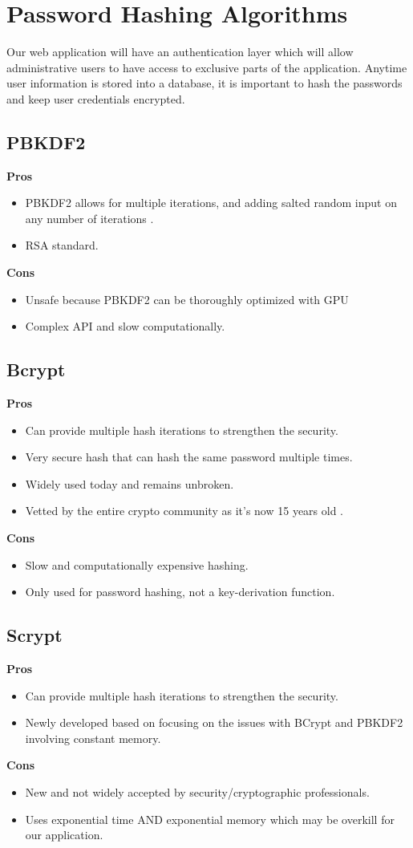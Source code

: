\documentclass[onecolumn, draftclsnofoot,10pt, compsoc]{IEEEtran}
\begin{document}
\section{Password Hashing Algorithms}
Our web application will have an authentication layer which will allow administrative users to have access to exclusive parts of the application. Anytime user information is stored into a database, it is important to hash the passwords and keep user credentials encrypted.
\subsection{PBKDF2}
\textbf{Pros}
\begin{itemize}
    \item PBKDF2 allows for multiple iterations, and adding salted random input on any number of iterations \cite{jarmoc_2015}.
    \item RSA standard.    
\end{itemize}
\textbf{Cons}
\begin{itemize}
    \item Unsafe because PBKDF2 can be thoroughly optimized with GPU \cite{pornin_2012} 
    \item Complex API and slow computationally.
\end{itemize}
\subsection{Bcrypt}
\textbf{Pros}
\begin{itemize}
    \item Can provide multiple hash iterations to strengthen the security.
    \item Very secure hash that can hash the same password multiple times.
    \item Widely used today and remains unbroken.
    \item Vetted by the entire crypto community as it’s now 15 years old \cite{medium}.
\end{itemize}
\textbf{Cons} 
\begin{itemize}
    \item Slow and computationally expensive hashing.
    \item Only used for password hashing, not a key-derivation function. 
\end{itemize}
\subsection{Scrypt}
\textbf{Pros}
\begin{itemize}
    \item Can provide multiple hash iterations to strengthen the security.
    \item Newly developed based on focusing on the issues with BCrypt and PBKDF2 involving constant memory.
\end{itemize}
\textbf{Cons}
\begin{itemize}
    \item New and not widely accepted by security/cryptographic professionals.
    \item Uses exponential time AND exponential memory which may be overkill for our application.
\end{itemize}
\end{document}
